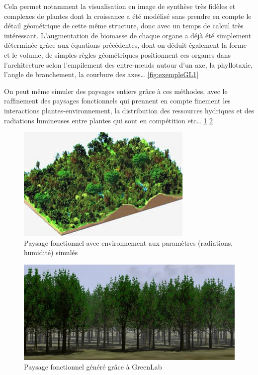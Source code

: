 {\begin{figure}[h]
\begin{center}
  \end{center}
\end{figure}

Cela permet notamment la visualisation en image de synthèse très fidèles et complexes de plantes dont la croissance a été modélisé sans prendre en compte le détail géométrique de cette même structure, donc avec un temps de calcul très intéressant. L’augmentation de biomasse de chaque organe a déjà été simplement déterminée grâce aux équations précédentes, dont on déduit également la forme et le volume, de simples règles géométriques positionnent ces organes dans l’architecture selon l’empilement des entre-nœuds autour d’un axe, la phyllotaxie, l’angle de branchement, la courbure des axes… \ref{fig:exempleGL1}

On peut même simuler des paysages entiers grâce à ces méthodes, avec le raffinement des paysages fonctionnels qui prennent en compte finement les interactions plantes-environnement, la distribution des ressources hydriques et des radiations lumineuses entre plantes qui sont en compétition etc… \ref{fig:exempleP1} \ref{fig:exempleP2}

\begin{figure}[h]
	\begin{center}
	
	
  \includegraphics[scale=1.0]{./img/exempleP1.jpg}
  \caption{Paysage fonctionnel avec environnement aux paramètres (radiations, humidité) simulés}
  \label{fig:exempleP1}
  
  \end{center}
\end{figure}

\begin{figure}[h]
	\begin{center}
	
	
  \includegraphics[scale=1.0]{./img/exempleP2.jpg}
  \caption{Paysage fonctionnel généré grâce à GreenLab}
  \label{fig:exempleP2}
  

\end{center}
\end{figure}}
